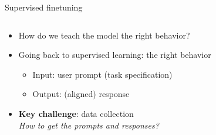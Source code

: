 \documentclass[usenames,dvipsnames,notes,11pt,aspectratio=169,hyperref={colorlinks=true, linkcolor=blue}]{beamer}
\begin{document}
\begin{frame}
    {Supervised finetuning}
    \begin{columns}
        \begin{column}{0.6\textwidth}
            \begin{itemize}
                \item How do we teach the model the right behavior?  
                \item Going back to supervised learning:  the right behavior
                    \begin{itemize}
                        \item Input: user prompt (task specification)
                        \item Output: (aligned) response
                    \end{itemize}
                \item {\bf Key challenge}: {data collection} \\
                    {\em How to get the prompts and responses?}


\end{itemize}
\end{column}
\end{columns}
\end{frame}
\end{document}
